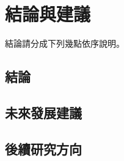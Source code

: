 \chapter{結論與建議}

結論請分成下列幾點依序說明。

\section{結論}
\blindtext[1]


\section{未來發展建議}

\blindtext[1]

\section{後續研究方向}

\blindtext[1]






